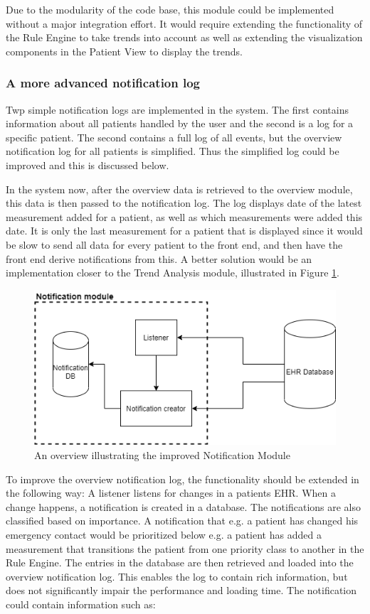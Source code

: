 \documentclass{article}
\begin{document}
Due to the modularity of the code base, this module could be implemented without a major integration effort. It would require extending the functionality of the Rule Engine to take trends into account as well as extending the visualization components in the Patient View to display the trends.


\subsubsection{A more advanced notification log}
Twp simple notification logs are implemented in the system. The first contains information about all patients handled by the user and the second is a log for a specific patient. The second contains a full log of all events, but the overview notification log for all patients is simplified. Thus the simplified log could be improved and this is discussed below.

In the system now, after the overview data is retrieved to the overview module, this data is then passed to the notification log. The log displays date of the latest measurement added for a patient, as well as which measurements were added this date. It is only the last measurement for a patient that is displayed since it would be slow to send all data for every patient to the front end, and then have the front end derive notifications from this. A better solution would be an implementation closer to the Trend Analysis module, illustrated in Figure \ref{fig:notification-module}.

\begin{figure}[h]
    \centering
    \includegraphics[scale = 0.45]{notification-module}
    \caption{An overview illustrating the improved Notification Module}
    \label{fig:notification-module}
\end{figure}

To improve the overview notification log, the functionality should be extended in the following way: A listener listens for changes in a patients EHR. When a change happens, a notification is created in a database. The notifications are also classified based on importance. A notification that e.g. a patient has changed his emergency contact would be prioritized below e.g. a patient has added a measurement that transitions the patient from one priority class to another in the Rule Engine. The entries in the database are then retrieved and loaded into the overview notification log. This enables the log to contain rich information, but does not significantly impair the performance and loading time. The notification could contain information such as:
\end{document}

